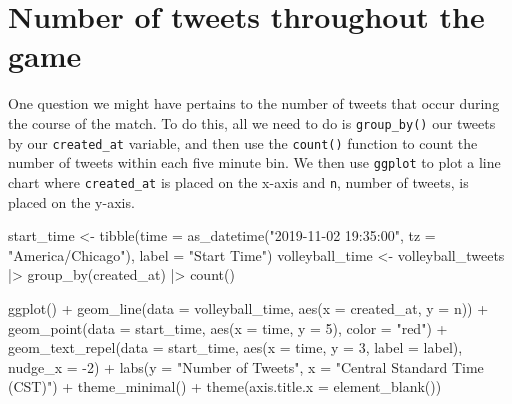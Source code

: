 \documentclass[
  letterpaper,
  DIV=11,
  numbers=noendperiod]{scrreprt}
\newenvironment{Shaded}{\begin{snugshade}}{\end{snugshade}}
\newcommand{\AttributeTok}[1]{\textcolor[rgb]{0.40,0.45,0.13}{#1}}
\newcommand{\DecValTok}[1]{\textcolor[rgb]{0.68,0.00,0.00}{#1}}
\newcommand{\FunctionTok}[1]{\textcolor[rgb]{0.28,0.35,0.67}{#1}}
\newcommand{\NormalTok}[1]{\textcolor[rgb]{0.00,0.23,0.31}{#1}}
\newcommand{\OtherTok}[1]{\textcolor[rgb]{0.00,0.23,0.31}{#1}}
\newcommand{\SpecialCharTok}[1]{\textcolor[rgb]{0.37,0.37,0.37}{#1}}
\newcommand{\StringTok}[1]{\textcolor[rgb]{0.13,0.47,0.30}{#1}}
\begin{document}
\hypertarget{number-of-tweets-throughout-the-game}{%
\section{Number of tweets throughout the
game}\label{number-of-tweets-throughout-the-game}}

One question we might have pertains to the number of tweets that occur
during the course of the match. To do this, all we need to do is
\texttt{group\_by()} our tweets by our \texttt{created\_at} variable,
and then use the \texttt{count()} function to count the number of tweets
within each five minute bin. We then use \texttt{ggplot} to plot a line
chart where \texttt{created\_at} is placed on the x-axis and \texttt{n},
number of tweets, is placed on the y-axis.

\begin{Shaded}
\begin{Highlighting}[]
\NormalTok{start\_time }\OtherTok{\textless{}{-}} \FunctionTok{tibble}\NormalTok{(}\AttributeTok{time =} \FunctionTok{as\_datetime}\NormalTok{(}\StringTok{"2019{-}11{-}02 19:35:00"}\NormalTok{, }\AttributeTok{tz =} \StringTok{"America/Chicago"}\NormalTok{), }\AttributeTok{label =} \StringTok{"Start Time"}\NormalTok{) }
\NormalTok{volleyball\_time }\OtherTok{\textless{}{-}}\NormalTok{ volleyball\_tweets }\SpecialCharTok{|\textgreater{}}
  \FunctionTok{group\_by}\NormalTok{(created\_at) }\SpecialCharTok{|\textgreater{}} 
  \FunctionTok{count}\NormalTok{()}

\FunctionTok{ggplot}\NormalTok{() }\SpecialCharTok{+}
  \FunctionTok{geom\_line}\NormalTok{(}\AttributeTok{data =}\NormalTok{ volleyball\_time, }\FunctionTok{aes}\NormalTok{(}\AttributeTok{x =}\NormalTok{ created\_at, }\AttributeTok{y =}\NormalTok{ n)) }\SpecialCharTok{+}
  \FunctionTok{geom\_point}\NormalTok{(}\AttributeTok{data =}\NormalTok{ start\_time, }\FunctionTok{aes}\NormalTok{(}\AttributeTok{x =}\NormalTok{ time, }\AttributeTok{y =} \DecValTok{5}\NormalTok{), }\AttributeTok{color =} \StringTok{"red"}\NormalTok{) }\SpecialCharTok{+}
  \FunctionTok{geom\_text\_repel}\NormalTok{(}\AttributeTok{data =}\NormalTok{ start\_time, }\FunctionTok{aes}\NormalTok{(}\AttributeTok{x =}\NormalTok{ time, }\AttributeTok{y =} \DecValTok{3}\NormalTok{, }\AttributeTok{label =}\NormalTok{ label), }\AttributeTok{nudge\_x =} \SpecialCharTok{{-}}\DecValTok{2}\NormalTok{) }\SpecialCharTok{+}
  \FunctionTok{labs}\NormalTok{(}\AttributeTok{y =} \StringTok{"Number of Tweets"}\NormalTok{,}
       \AttributeTok{x =} \StringTok{"Central Standard Time (CST)"}\NormalTok{) }\SpecialCharTok{+}
  \FunctionTok{theme\_minimal}\NormalTok{() }\SpecialCharTok{+}
  \FunctionTok{theme}\NormalTok{(}\AttributeTok{axis.title.x =} \FunctionTok{element\_blank}\NormalTok{())}
\end{Highlighting}
\end{Shaded}
\end{document}
